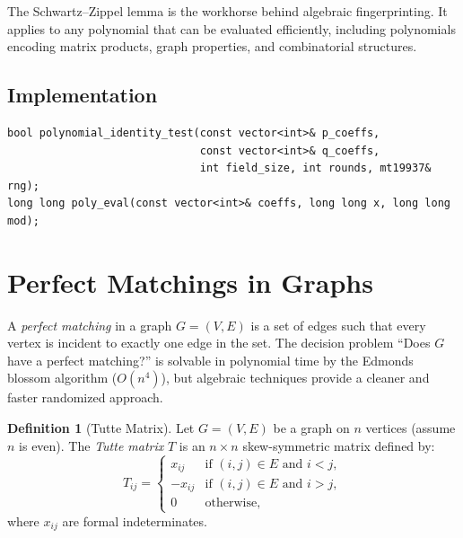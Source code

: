 \documentclass[twoside,12pt]{book}
\theoremstyle{plain}
\theoremstyle{definition}
\newtheorem{definition}[theorem]{Definition}
\theoremstyle{remark}
\newenvironment{cpplisting}{\begin{center}\small}{\end{center}}
\begin{document}
The Schwartz--Zippel lemma is the workhorse behind algebraic fingerprinting. It applies to any polynomial that can be evaluated efficiently, including polynomials encoding matrix products, graph properties, and combinatorial structures.

\subsection*{Implementation}

\begin{cpplisting}
\begin{lstlisting}[title={Polynomial identity testing --- \texttt{src/chapter8/polynomial.h}}]
bool polynomial_identity_test(const vector<int>& p_coeffs,
                              const vector<int>& q_coeffs,
                              int field_size, int rounds, mt19937& rng);
long long poly_eval(const vector<int>& coeffs, long long x, long long mod);
\end{lstlisting}
\end{cpplisting}


\section{Perfect Matchings in Graphs}
\label{sec:perfect-matchings}

A \emph{perfect matching} in a graph $G = (V, E)$ is a set of edges such that every vertex is incident to exactly one edge in the set. The decision problem ``Does $G$ have a perfect matching?'' is solvable in polynomial time by the Edmonds blossom algorithm ($O(n^4)$), but algebraic techniques provide a cleaner and faster randomized approach.

\begin{definition}[Tutte Matrix]
Let $G = (V, E)$ be a graph on $n$ vertices (assume $n$ is even). The \emph{Tutte matrix} $T$ is an $n \times n$ skew-symmetric matrix defined by:
\[
T_{ij} = \begin{cases}
x_{ij} & \text{if } (i,j) \in E \text{ and } i < j, \\
-x_{ij} & \text{if } (i,j) \in E \text{ and } i > j, \\
0 & \text{otherwise},
\end{cases}
\]
where $x_{ij}$ are formal indeterminates.
\end{definition}
\end{document}
